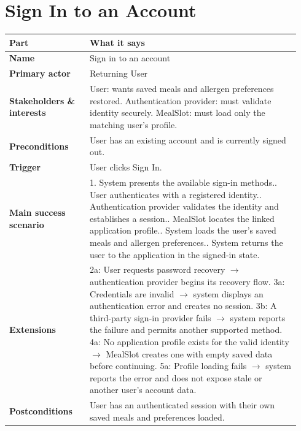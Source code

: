 \documentclass[11pt,twocolumn]{article}
\newcommand{\ucheader}{%
\textbf{Part} & \textbf{What it says} \\
\hline
\endhead
\hline
\endfoot
}
\begin{document}
\section{Sign In to an Account}
{\footnotesize
\begin{longtable}{@{}p{0.26\linewidth}p{0.68\linewidth}@{}}
\hline
\ucheader
\textbf{Name} & Sign in to an account \\
\hline
\textbf{Primary actor} & Returning User \\
\hline
\textbf{Stakeholders \& interests} & User: wants saved meals and allergen preferences restored. Authentication provider: must validate identity securely. MealSlot: must load only the matching user's profile. \\
\hline
\textbf{Preconditions} & User has an existing account and is currently signed out. \\
\hline
\textbf{Trigger} & User clicks Sign In. \\
\hline
\textbf{Main success scenario} & 1. System presents the available sign-in methods.\newline
2. User authenticates with a registered identity.\newline
3. Authentication provider validates the identity and establishes a session.\newline
4. MealSlot locates the linked application profile.\newline
5. System loads the user's saved meals and allergen preferences.\newline
6. System returns the user to the application in the signed-in state. \\
\hline
\textbf{Extensions} & 2a: User requests password recovery $\rightarrow$ authentication provider begins its recovery flow.\newline
3a: Credentials are invalid $\rightarrow$ system displays an authentication error and creates no session.\newline
3b: A third-party sign-in provider fails $\rightarrow$ system reports the failure and permits another supported method.\newline
4a: No application profile exists for the valid identity $\rightarrow$ MealSlot creates one with empty saved data before continuing.\newline
5a: Profile loading fails $\rightarrow$ system reports the error and does not expose stale or another user's account data. \\
\hline
\textbf{Postconditions} & User has an authenticated session with their own saved meals and preferences loaded. \\
\hline
\end{longtable}
}
\end{document}
